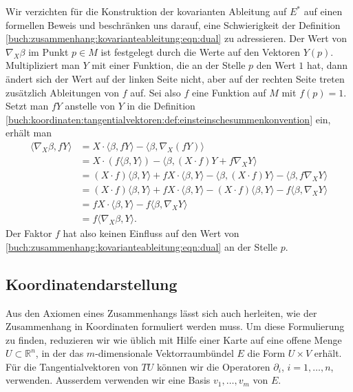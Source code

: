 Wir verzichten für die Konstruktion der kovarianten Ableitung auf $E^*$
auf einen formellen Beweis und beschränken uns darauf, eine Schwierigkeit
der Definition \eqref{buch:zusammenhang:kovarianteableitung:eqn:dual}
zu adressieren.
Der Wert von $\nabla_X\beta$ im Punkt $p\in M$ ist festgelegt durch
die Werte auf den Vektoren $Y(p)$.
Multipliziert man $Y$ mit einer Funktion, die an der Stelle $p$ den Wert
$1$ hat, dann ändert sich der Wert auf der linken Seite nicht, aber
auf der rechten Seite treten zusätzlich Ableitungen von $f$ auf.
Sei also $f$ eine Funktion auf $M$ mit $f(p)=1$.
Setzt man $fY$ anstelle von $Y$ in die Definition
\eqref{buch:koordinaten:tangentialvektoren:def:einsteinschesummenkonvention}
ein, erhält man
\begin{align*}
\langle
\nabla_X \beta,fY
\rangle
&=
X\cdot\langle \beta,fY\rangle
-
\langle \beta,\nabla_X(fY)\rangle
\\
&=
X\cdot(f\langle \beta,Y\rangle)
-
\langle \beta,
(X\cdot f)Y
+
f\nabla_XY
\rangle
\\
&=
(X\cdot f)\langle \beta,Y\rangle
+
fX\cdot \langle \beta,Y\rangle
-
\langle \beta,
(X\cdot f)Y
\rangle
-
\langle \beta,
f\nabla_XY
\rangle
\\
&=
(X\cdot f)
\langle \beta,Y\rangle
+
f X\cdot \langle \beta,Y\rangle
-
(X\cdot f) \langle \beta, Y \rangle
-
f\langle \beta, \nabla_XY \rangle
\\
&=
f X\cdot \langle \beta,Y\rangle
-
f\langle \beta, \nabla_XY \rangle
\\
&=
f
\langle \nabla_X\beta,Y\rangle.
\end{align*}
Der Faktor $f$ hat also keinen Einfluss auf den Wert von
\eqref{buch:zusammenhang:kovarianteableitung:eqn:dual} an der Stelle $p$.

%
%
\subsection{Koordinatendarstellung}
Aus den Axiomen eines Zusammenhangs lässt sich auch herleiten, wie
der Zusammenhang in Koordinaten formuliert werden muss.
Um diese Formulierung zu finden, reduzieren wir wie üblich mit Hilfe
einer Karte auf eine offene Menge $U\subset\mathbb{R}^n$, in der das
$m$-dimensionale Vektorraumbündel $E$ die Form $U\times V$ erhält.
Für die Tangentialvektoren von $TU$ können wir die Operatoren
$\partial_i$, $i=1,\dots,n$, verwenden.
Ausserdem verwenden wir eine Basis $v_1,\dots,v_m$ von $E$.

